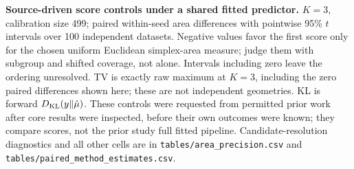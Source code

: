 \textbf{Source-driven score controls under a shared fitted predictor.} $K=3$, calibration size 499; paired within-seed area differences with pointwise 95\% $t$ intervals over 100 independent datasets. Negative values favor the first score only for the chosen uniform Euclidean simplex-area measure; judge them with subgroup and shifted coverage, not alone. Intervals including zero leave the ordering unresolved. TV is exactly raw maximum at $K=3$, including the zero paired differences shown here; these are not independent geometries. KL is forward $D_{\rm KL}(y\Vert\hat\mu)$. These controls were requested from permitted prior work after core results were inspected, before their own outcomes were known; they compare scores, not the prior study full fitted pipeline. Candidate-resolution diagnostics and all other cells are in \texttt{tables/area\_precision.csv} and \texttt{tables/paired\_method\_estimates.csv}.
